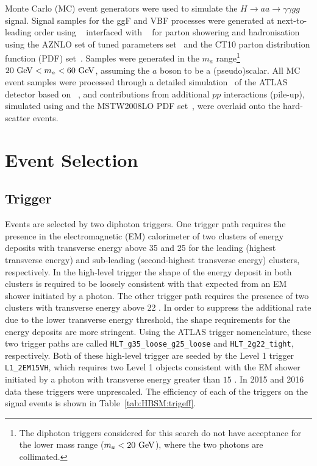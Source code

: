 Monte Carlo (MC) event generators were used to simulate the $H\to aa \to \gamma\gamma gg$ signal.
Signal samples for the ggF and VBF processes were generated at next-to-leading order using 
\POWHEGBOX{}~\cite{Nason:2004rx,Frixione:2007vw,Alioli:2010xd} interfaced with \PYTHIA{}~\cite{Sjostrand:2014zea} for parton showering and hadronisation using the AZNLO set of tuned parameters set~\cite{STDM-2012-23} and the CT10 parton distribution function (PDF) set~\cite{Lai:2010vv}.
Samples were generated in the $m_a$ range\footnote{The diphoton triggers considered for this
search do not have acceptance for the lower mass range ($m_a<20~\mathrm{GeV}{}$), where the two photons are collimated.} 
$20~\mathrm{GeV}{} < m_a < 60~\mathrm{GeV}{}$, assuming the $a$ boson to be a (pseudo)scalar.
All MC event samples were processed through a detailed simulation~\cite{SOFT-2010-01} of the ATLAS detector
based on \geantFour{}~\cite{Agostinelli:2002hh}, and contributions from additional $pp$ interactions (pile-up), simulated using
\PYTHIA{} and the MSTW2008LO PDF set~\cite{Martin:2009iq}, were overlaid onto the hard-scatter events.

\section{Event Selection}
\subsection{Trigger}
\label{sec:HBSM:trigger}
Events are selected by two diphoton triggers.
One trigger path requires the presence in the electromagnetic (EM) calorimeter of two clusters of energy
deposits with transverse energy
above 35 \GeV{} and 25 \GeV{} for the leading (highest transverse energy) and sub-leading
(second-highest transverse energy) clusters, respectively.
In the high-level trigger the shape of the energy deposit in both clusters is required to be loosely consistent with that expected from an EM shower initiated by a photon.
The other trigger path requires the presence of two clusters with transverse energy above 22 \GeV{}.
In order to suppress the additional rate due to the lower transverse energy threshold, the shape requirements for the energy deposits are
more stringent.
Using the ATLAS trigger nomenclature, these two trigger paths are called \texttt{HLT\_g35\_loose\_g25\_loose} and \texttt{HLT\_2g22\_tight}, respectively.
Both of these high-level trigger are seeded by the Level 1 trigger \texttt{L1\_2EM15VH}, which requires two Level 1 objects consistent with the EM shower initiated by a photon with transverse energy greater than $15$ \GeV{}.
In 2015 and 2016 data these triggers were unprescaled.
The efficiency of each of the triggers on the signal events is shown in Table~\ref{tab:HBSM:trigeff}.

